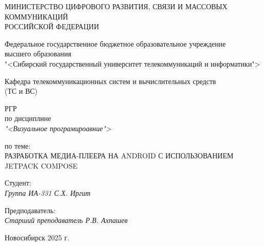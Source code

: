 \thispagestyle{empty}

\begin{center}
    МИНИСТЕРСТВО ЦИФРОВОГО РАЗВИТИЯ, СВЯЗИ И МАССОВЫХ КОММУНИКАЦИЙ \\ РОССИЙСКОЙ ФЕДЕРАЦИИ

    \vspace{20pt}

    Федеральное государственное бюджетное образовательное учреждение  \\  высшего образования \\
    "<Сибирский государственный университет телекоммуникаций и информатики"> \\

    \vspace{20pt}

    Кафедра телекоммуникационных систем и вычислительных средств \\  (ТС и ВС)
\end{center}

\vfill

\begin{center}
    РГР \\  
    по дисциплине \\
    \textit{"<Визуальное програмироавние">}

    \vspace{20pt}

    по теме: \\
    \uppercase{Разработка Медиа-плеера на Android с использованием Jetpack Compose}
\end{center}

\vfill

    \noindent Студент: \\
    \textit{Группа ИА-331 \hfill С.Х. Иргит}

    \vspace{20pt}

    \noindent Предподаватель: \\
    \textit{Старший преподаватель \hfill Р.В. Ахпашев}

\vfill

\begin{center}
    Новосибирск 2025 г.
\end{center}